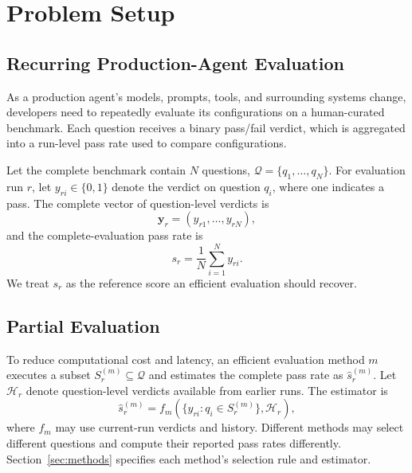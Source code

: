 \section{Problem Setup}
\label{sec:problem-setup}

\subsection{Recurring Production-Agent Evaluation}

As a production agent’s models, prompts, tools, and surrounding systems change,
developers need to repeatedly evaluate its configurations on a human-curated benchmark.
Each question receives a binary pass/fail verdict, which is aggregated into a
run-level pass rate used to compare configurations.

Let the complete benchmark contain $N$ questions,
$\mathcal{Q}=\{q_1,\ldots,q_N\}$. For evaluation run $r$, let
$y_{ri}\in\{0,1\}$ denote the verdict on question $q_i$, where one indicates a
pass. The complete vector of question-level verdicts is
\vspace{-0.3em}
\begin{equation}
  \mathbf{y}_r = (y_{r1},\ldots,y_{rN}),
\end{equation}\vspace{-0.5em}
and the complete-evaluation pass rate is
\begin{equation}
  s_r = \frac{1}{N}\sum_{i=1}^{N}y_{ri}.
\end{equation}
We treat $s_r$ as the reference score an efficient evaluation should recover.

\subsection{Partial Evaluation}

To reduce computational cost and latency, an efficient evaluation method $m$ executes a subset
$S_r^{(m)}\subseteq\mathcal{Q}$ and estimates the complete pass rate as
$\hat{s}_r^{(m)}$. Let $\mathcal{H}_r$ denote question-level verdicts available
from earlier runs. The estimator is
\begin{equation}
  \hat{s}_r^{(m)} =
  f_m\!\left(\{y_{ri}:q_i\in S_r^{(m)}\},\mathcal{H}_r\right),
\end{equation}
where $f_m$ may use current-run verdicts and history. Different methods may select different questions and compute their reported pass rates differently. Section~\ref{sec:methods} specifies each method’s selection rule and estimator.

